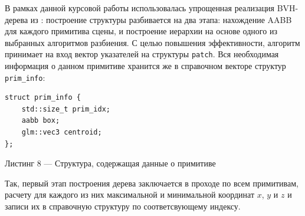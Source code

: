 \documentclass[12pt]{article}
\begin{document}
В рамках данной курсовой работы использовалась упрощенная реализация BVH-дерева из \cite{Pha17}: построение структуры разбивается на два этапа: нахождение AABB для каждого примитива сцены, и построение иерархии на основе одного из выбранных алгоритмов разбиения. С целью повышения эффективности, алгоритм принимает на вход вектор указателей на структуры \texttt{patch}. Вся необходимая информация о данном примитиве хранится же в справочном векторе структур \texttt{prim\_info}:
\begin{lstlisting}
struct prim_info {
    std::size_t prim_idx;
    aabb box;
    glm::vec3 centroid;
};
\end{lstlisting}
\begin{center}Листинг 8 --- Структура, содержащая данные о примитиве \end{center}

Так, первый этап построения дерева заключается в проходе по всем примитивам, расчету для каждого из них максимальной и минимальной координат $x$, $y$ и $z$ и записи их в справочную структуру по соответсвующему индексу.
\end{document}

